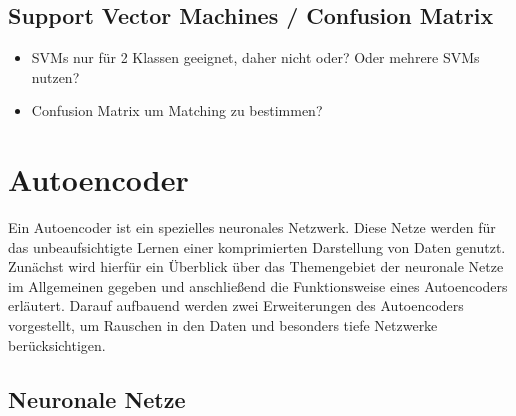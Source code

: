 \subsection{Support Vector Machines / Confusion Matrix}

\begin{itemize}
	\item SVMs nur für 2 Klassen geeignet, daher nicht oder? Oder mehrere SVMs nutzen?
	\item Confusion Matrix um Matching zu bestimmen? 
\end{itemize}

\section{Autoencoder}

Ein Autoencoder ist ein spezielles neuronales Netzwerk. Diese Netze werden für das unbeaufsichtigte Lernen einer komprimierten Darstellung von Daten genutzt. Zunächst wird hierfür ein Überblick über das Themengebiet der neuronale Netze im Allgemeinen gegeben und anschließend die Funktionsweise eines Autoencoders erläutert. Darauf aufbauend werden zwei Erweiterungen des Autoencoders vorgestellt, um Rauschen in den Daten und besonders tiefe Netzwerke berücksichtigen.

\subsection{Neuronale Netze}

